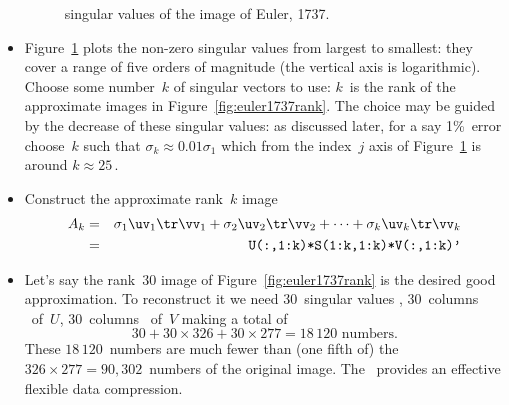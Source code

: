 \begin{example}
\begin{solution}
\begin{itemize}
\begin{figure}
\caption{singular values of the image of Euler, 1737.}
\label{fig:euler1737sing}
\centering

\end{figure}
\item Figure~\ref{fig:euler1737sing} plots the non-zero singular values from largest to smallest: they cover a range of five orders of magnitude (the vertical axis is logarithmic).
Choose some number~\(k\) of singular vectors to use: \(k\)~is the rank of the approximate images in Figure~\ref{fig:euler1737rank}.
The choice may be guided by the decrease of these singular values: as discussed later, for a say 1\%~error choose~\(k\) such that \(\sigma_k\approx 0.01\sigma_1\) which from the index~\(j\) axis of Figure~\ref{fig:euler1737sing} is around \(k\approx 25\)\,.

\item Construct the approximate rank~\(k\) image
\begin{eqnarray*}
A_k&=&\sigma_1\uv_1\tr\vv_1+\sigma_2\uv_2\tr\vv_2+\cdots+\sigma_k\uv_k\tr\vv_k
\\&=&\verb|U(:,1:k)*S(1:k,1:k)*V(:,1:k)'|
\end{eqnarray*}

\item Let's say the rank~\(30\) image of Figure~\ref{fig:euler1737rank} is the desired good approximation.  
To reconstruct it we need \(30\)~singular values \hlist{}, \(30\)~columns \hlist{}\ of~\(U\), \(30\)~columns \hlist{}\ of~\(V\) making a total of
\begin{equation*}
30+30\times326+30\times277=18\,120\text{ numbers}.
\end{equation*}
These \(18\,120\)~numbers are much fewer than (one fifth of) the \(326\times277=90,302\)~numbers of the original image.
The \svd\ provides an effective flexible data compression.
\end{itemize}
\end{solution}
\end{example}









